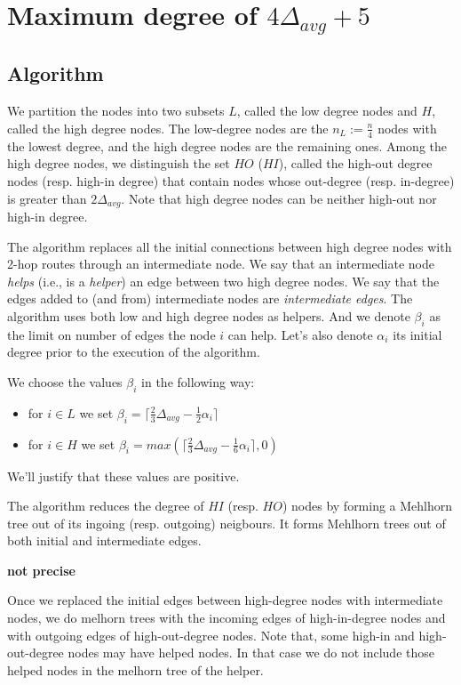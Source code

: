 \documentclass{article}
\begin{document}
\section{Maximum degree of $4\Delta_{avg} + 5$}

\subsection{Algorithm}

We partition the nodes into two subsets $L$, called the low degree nodes and $H$, called
the high degree nodes. The low-degree nodes are
the $n_L := \frac{n}{4}$ nodes with the lowest degree, and the high degree nodes
are the remaining ones.
Among the high degree nodes, we distinguish the set $HO$ ($HI$), called the high-out degree nodes (resp. high-in degree) that contain nodes whose out-degree (resp. in-degree) is greater than
$2\Delta_{avg}$.
Note that high degree nodes can be neither high-out nor high-in degree.

The algorithm replaces all the initial connections between high degree nodes with 2-hop routes through an intermediate node.
We say that an intermediate node \emph{helps} (i.e., is a \emph{helper}) an edge between two high degree nodes.
We say that the edges added to (and from) intermediate nodes are \emph{intermediate edges}.
The algorithm uses both low and high degree nodes as helpers. And we denote
$\beta_i$ as the limit on number of edges the node $i$ can help.
Let's also denote $\alpha_i$ its initial degree prior to the execution of 
the algorithm.

We choose the values $\beta_i$ in the following way:
\begin{itemize}
  \item for $i \in L$ we set
  $\beta_i = \lceil\frac{2}{3}\Delta_{avg}-\frac{1}{2}\alpha_i\rceil$
  \item for $i \in H$ we set
  $\beta_i = max(\lceil\frac{2}{3}\Delta_{avg}-\frac{1}{6}\alpha_i\rceil, 0)$
\end{itemize}
We'll justify that these values are positive.

The algorithm reduces the degree of $HI$ (resp. $HO$) nodes by forming a Mehlhorn tree out of its ingoing (resp. outgoing) neigbours.
It forms Mehlhorn trees out of both initial and intermediate edges.

\textbf{not precise}


Once we replaced the initial edges between high-degree nodes with intermediate nodes,
we do melhorn trees with the incoming edges of high-in-degree
nodes and with outgoing edges of high-out-degree nodes.
Note that, some high-in and high-out-degree nodes may have helped nodes.
In that case we do not include those helped nodes in the melhorn tree of the helper.
\end{document}
